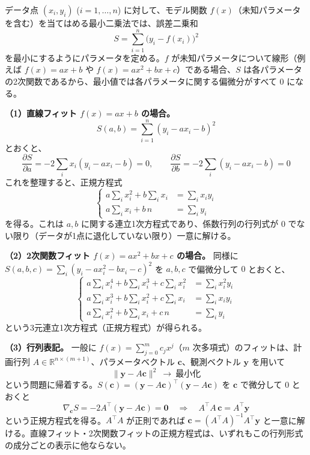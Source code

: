 \documentclass[a4paper,11pt]{article}
\begin{document}


\noindent
データ点 $(x_i, y_i)$ ($i=1,\dots,n$) に対して、モデル関数 $f(x)$（未知パラメータを含む）を当てはめる最小二乗法では、誤差二乗和
\[
S = \sum_{i=1}^{n} \bigl(y_i - f(x_i)\bigr)^2
\]
を最小にするようにパラメータを定める。$f$ が未知パラメータについて線形（例えば $f(x) = a x + b$ や $f(x) = ax^2+bx+c$）である場合、$S$ は各パラメータの2次関数であるから、最小値では各パラメータに関する偏微分がすべて $0$ になる。

\textbf{（1）直線フィット $f(x) = ax + b$ の場合。}
\[
S(a,b) = \sum_{i=1}^n (y_i - ax_i - b)^2
\]
とおくと、
\[
\frac{\partial S}{\partial a} = -2\sum_i x_i(y_i - ax_i - b) = 0, \qquad
\frac{\partial S}{\partial b} = -2\sum_i (y_i - ax_i - b) = 0
\]
これを整理すると、正規方程式
\[
\left\{
\begin{aligned}
a\sum_i x_i^2 + b \sum_i x_i &= \sum_i x_i y_i \\
a\sum_i x_i + b\, n &= \sum_i y_i
\end{aligned}
\right.
\]
を得る。これは $a, b$ に関する連立1次方程式であり、係数行列の行列式が $0$ でない限り（データが1点に退化していない限り）一意に解ける。

\textbf{（2）2次関数フィット $f(x) = ax^2+bx+c$ の場合。} 同様に $S(a,b,c) = \sum_i (y_i - ax_i^2 - bx_i - c)^2$ を $a,b,c$ で偏微分して $0$ とおくと、
\[
\left\{
\begin{aligned}
a\sum_i x_i^4 + b\sum_i x_i^3 + c\sum_i x_i^2 &= \sum_i x_i^2 y_i \\
a\sum_i x_i^3 + b\sum_i x_i^2 + c\sum_i x_i &= \sum_i x_i y_i \\
a\sum_i x_i^2 + b\sum_i x_i + c\, n &= \sum_i y_i
\end{aligned}
\right.
\]
という3元連立1次方程式（正規方程式）が得られる。

\textbf{（3）行列表記。} 一般に $f(x) = \sum_{j=0}^{m} c_j x^j$（$m$ 次多項式）のフィットは、計画行列 $A \in \mathbb{R}^{n\times(m+1)}$、パラメータベクトル $\bm{c}$、観測ベクトル $\bm{y}$ を用いて
\[
\|\bm{y} - A\bm{c}\|^2 \ \longrightarrow\ \text{最小化}
\]
という問題に帰着する。$S(\bm{c}) = (\bm{y}-A\bm{c})^{\top}(\bm{y}-A\bm{c})$ を $\bm{c}$ で微分して $0$ とおくと
\[
\nabla_{\bm{c}} S = -2A^{\top}(\bm{y} - A\bm{c}) = \bm{0}
\quad\Longrightarrow\quad
A^{\top}A\,\bm{c} = A^{\top}\bm{y}
\]
という正規方程式を得る。$A^{\top}A$ が正則であれば $\bm{c} = (A^{\top}A)^{-1}A^{\top}\bm{y}$ と一意に解ける。直線フィット・2次関数フィットの正規方程式は、いずれもこの行列形式の成分ごとの表示に他ならない。
\end{document}
